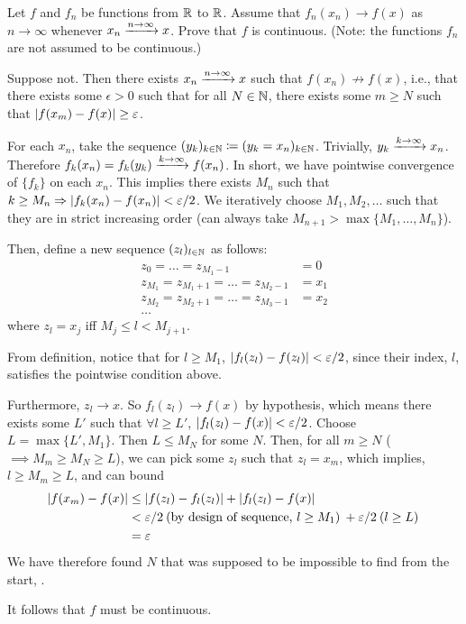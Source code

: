\documentclass[a4paper, 12pt]{article}
\begin{document}
\begin{problem} 
Let $f$ and $f_n$ be functions from $\mathbb{R}$ to $\mathbb{R}$. Assume that $f_n(x_n) \to f(x)$ as $n \to \infty$ whenever $x_n \xrightarrow{n \to \infty} x$. Prove that $f$ is continuous. (Note: the functions $f_n$ are not assumed to be continuous.)
\end{problem}
\begin{solution}
    Suppose not. Then there exists $x_n \xrightarrow{n \to \infty} x$ such that $f(x_n) \not \to f(x)$, i.e., that there exists some $\epsilon > 0$ such that for all $N \in \mathbb{N}$, there exists some $m \geq N$ such that $\lvert f(x_m) - f(x)\rvert \geq \varepsilon$.

    For each $x_n$, take the sequence $(y_k)_{k \in \mathbb{N}} \coloneqq (y_k = x_n)_{k \in \mathbb{N}}$. Trivially, $y_k \xrightarrow{k \to \infty} x_n$. Therefore $f_k(x_n) = f_k(y_k) \xrightarrow{k \to \infty} f(x_n)$. In short, we have pointwise convergence of $\{f_k\}$ on each $x_n$. This implies there exists $M_n$ such that $k \geq M_n \Rightarrow \lvert f_k(x_n) - f(x_n)\rvert < \varepsilon/2$. We iteratively choose $M_1, M_2, \ldots$ such that they are in strict increasing order (can always take $M_{n+1} > \max\{M_1, \ldots, M_n\}$).

    Then, define a new sequence $(z_l)_{l \in \mathbb{N}}$ as follows: 
    \begin{align*}
        z_0 = \ldots = z_{M_1 - 1} &= 0 \\
        z_{M_1} = z_{M_1 + 1} = \ldots = z_{M_2 - 1} &= x_1 \\
        z_{M_2} = z_{M_2 + 1} = \ldots = z_{M_3 - 1} &= x_2 \\
        \ldots
    \end{align*}
    where $z_l = x_j$ iff $M_j \leq l < M_{j+1}$.

    From definition, notice that for $l \geq M_1$,  $\lvert f_l(z_l) - f(z_l)\rvert < \varepsilon / 2$, since their index, $l$, satisfies the pointwise condition above.

    Furthermore, $z_l \to x$. So $f_l(z_l) \to f(x)$ by hypothesis, which means there exists some $L'$ such that $\forall l \geq L'$, $\lvert f_l(z_l) - f(x)\rvert < \varepsilon/2$. Choose $L = \max\{L', M_1\}$. Then $L \leq M_N$ for some $N$. Then, for all $m \geq N$ ($\implies M_m \geq M_N \geq L$), we can pick some $z_l$ such that $z_l = x_m$, which implies, $l \geq M_m \geq L$,
    and can bound
    \begin{align*}
        \lvert f(x_m) - f(x)\rvert & \leq \lvert f(z_l) - f_l(z_l)\rvert + \lvert f_l(z_l) - f(x)\rvert \\
                    &<  \varepsilon/2 \:\text{(by design of sequence, $l \geq M_1$)}\:  + \varepsilon/2 \:\text{($l \geq L$)}\:  \\
                    &= \varepsilon
    \end{align*}
    We have therefore found $N$ that was supposed to be impossible to find from the start, \contra.

    It follows that $f$ must be continuous.
\end{solution}
\end{document}
